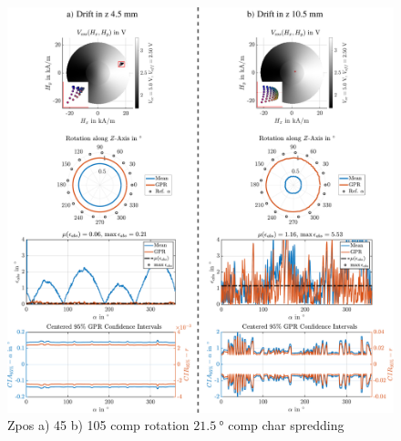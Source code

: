 \clearpage
\begin{figure}[tbph]
	\centering
	\includegraphics[width=\linewidth]{chapters/images/4-EuOExp/Z-Pos-Comp-45-105-Rotation}
	\caption[Zpos 45 105 comp rotation]{Zpos a) 45 b) 105 comp rotation $\SI{21,5}{\degree}$ comp char spredding}
	\label{fig:z-pos-comp-45-105-rotation}
\end{figure}


\clearpage

